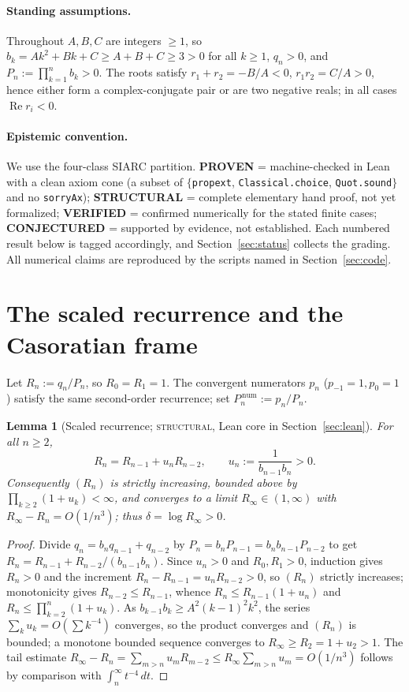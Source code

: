 \documentclass[11pt]{article}
\newtheorem{lemma}{Lemma}
\newcommand{\Rinf}{R_\infty}
\begin{document}
\paragraph{Standing assumptions.}
Throughout $A,B,C$ are integers $\ge1$, so $b_k=Ak^2+Bk+C\ge A+B+C\ge3>0$ for all
$k\ge1$, $q_n>0$, and $P_n:=\prod_{k=1}^nb_k>0$. The roots satisfy
$r_1+r_2=-B/A<0$, $r_1r_2=C/A>0$, hence either form a complex-conjugate pair or are
two negative reals; in all cases $\operatorname{Re}r_i<0$.

\paragraph{Epistemic convention.}
We use the four-class SIARC partition. \textbf{PROVEN} = machine-checked in Lean
with a clean axiom cone (a subset of $\{$\texttt{propext}, \texttt{Classical.choice},
\texttt{Quot.sound}$\}$ and no
\texttt{sorryAx}); \textbf{STRUCTURAL} = complete elementary hand proof, not yet
formalized; \textbf{VERIFIED} = confirmed numerically for the stated finite cases;
\textbf{CONJECTURED} = supported by evidence, not established. Each numbered result
below is tagged accordingly, and Section~\ref{sec:status} collects the grading. All
numerical claims are reproduced by the scripts named in Section~\ref{sec:code}.

\section{The scaled recurrence and the Casoratian frame}\label{sec:frame}

Let $R_n:=q_n/P_n$, so $R_0=R_1=1$. The convergent numerators $p_n$
($p_{-1}=1,p_0=1$) satisfy the same second-order recurrence; set $P^{\,\mathrm{num}}_n:=p_n/P_n$.

\begin{lemma}[Scaled recurrence; \textsc{structural}, Lean core in
Section~\ref{sec:lean}]\label{lem:scaled}
For all $n\ge2$,
\[
  R_n=R_{n-1}+u_n R_{n-2},\qquad u_n:=\frac{1}{b_{n-1}b_n}>0 .
\]
Consequently $(R_n)$ is strictly increasing, bounded above by
$\prod_{k\ge2}(1+u_k)<\infty$, and converges to a limit
$\Rinf\in(1,\infty)$ with $\Rinf-R_n=O(1/n^3)$; thus $\delta=\log\Rinf>0$.
\end{lemma}

\begin{proof}
Divide $q_n=b_nq_{n-1}+q_{n-2}$ by $P_n=b_nP_{n-1}=b_nb_{n-1}P_{n-2}$ to get
$R_n=R_{n-1}+R_{n-2}/(b_{n-1}b_n)$. Since $u_n>0$ and $R_0,R_1>0$, induction gives
$R_n>0$ and the increment $R_n-R_{n-1}=u_nR_{n-2}>0$, so $(R_n)$ strictly increases;
monotonicity gives $R_{n-2}\le R_{n-1}$, whence $R_n\le R_{n-1}(1+u_n)$ and
$R_n\le\prod_{k=2}^n(1+u_k)$. As $b_{k-1}b_k\ge A^2(k-1)^2k^2$, the series
$\sum_k u_k=O(\sum k^{-4})$ converges, so the product converges and $(R_n)$ is
bounded; a monotone bounded sequence converges to $\Rinf\ge R_2=1+u_2>1$. The tail
estimate $\Rinf-R_n=\sum_{m>n}u_mR_{m-2}\le\Rinf\sum_{m>n}u_m=O(1/n^3)$ follows by
comparison with $\int_n^\infty t^{-4}\,dt$.
\end{proof}
\end{document}
